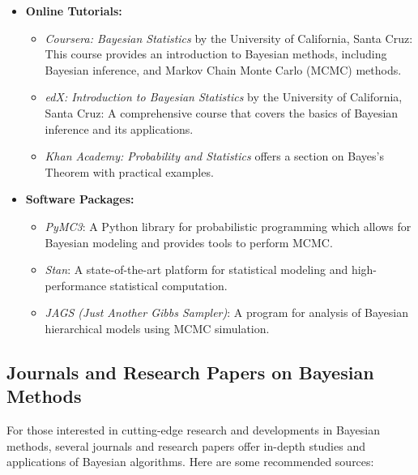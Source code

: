 \documentclass[12pt]{book} %
\begin{document}
\begin{itemize}
    \item \textbf{Online Tutorials:}
        \begin{itemize}
            \item \textit{Coursera: Bayesian Statistics} by the University of California, Santa Cruz: This course provides an introduction to Bayesian methods, including Bayesian inference, and Markov Chain Monte Carlo (MCMC) methods.
            \item \textit{edX: Introduction to Bayesian Statistics} by the University of California, Santa Cruz: A comprehensive course that covers the basics of Bayesian inference and its applications.
            \item \textit{Khan Academy: Probability and Statistics} offers a section on Bayes's Theorem with practical examples.
        \end{itemize}
    \item \textbf{Software Packages:}
        \begin{itemize}
            \item \textit{PyMC3}: A Python library for probabilistic programming which allows for Bayesian modeling and provides tools to perform MCMC.
            \item \textit{Stan}: A state-of-the-art platform for statistical modeling and high-performance statistical computation.
            \item \textit{JAGS (Just Another Gibbs Sampler)}: A program for analysis of Bayesian hierarchical models using MCMC simulation.
        \end{itemize}
\end{itemize}

\subsection{Journals and Research Papers on Bayesian Methods}
For those interested in cutting-edge research and developments in Bayesian methods, several journals and research papers offer in-depth studies and applications of Bayesian algorithms. Here are some recommended sources:
\end{document}
